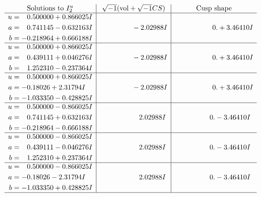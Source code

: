 \documentclass[1p]{elsarticle_modified}
\theoremstyle{definition}
\newcommand{\I}{\sqrt{-1}}
\begin{document}
$$\begin{array}{c|c|c}  
\text{Solutions to }I^u_{2}& \I (\text{vol} + \sqrt{-1}CS) & \text{Cusp shape}\\
 \hline 
\begin{aligned}
u &= \phantom{-}0.500000 + 0.866025 I \\
a &= \phantom{-}0.741145 - 0.632163 I \\
b &= -0.218964 + 0.666188 I\end{aligned}
 & \phantom{-0.000000 } -2.02988 I & \phantom{-0.000000 -}0. + 3.46410 I \\ \hline\begin{aligned}
u &= \phantom{-}0.500000 + 0.866025 I \\
a &= \phantom{-}0.439111 + 0.046276 I \\
b &= \phantom{-}1.252310 - 0.237364 I\end{aligned}
 & \phantom{-0.000000 } -2.02988 I & \phantom{-0.000000 -}0. + 3.46410 I \\ \hline\begin{aligned}
u &= \phantom{-}0.500000 + 0.866025 I \\
a &= -0.18026 + 2.31794 I \\
b &= -1.033350 - 0.428825 I\end{aligned}
 & \phantom{-0.000000 } -2.02988 I & \phantom{-0.000000 -}0. + 3.46410 I \\ \hline\begin{aligned}
u &= \phantom{-}0.500000 - 0.866025 I \\
a &= \phantom{-}0.741145 + 0.632163 I \\
b &= -0.218964 - 0.666188 I\end{aligned}
 & \phantom{-0.000000 -}2.02988 I & \phantom{-0.000000 } 0. - 3.46410 I \\ \hline\begin{aligned}
u &= \phantom{-}0.500000 - 0.866025 I \\
a &= \phantom{-}0.439111 - 0.046276 I \\
b &= \phantom{-}1.252310 + 0.237364 I\end{aligned}
 & \phantom{-0.000000 -}2.02988 I & \phantom{-0.000000 } 0. - 3.46410 I \\ \hline\begin{aligned}
u &= \phantom{-}0.500000 - 0.866025 I \\
a &= -0.18026 - 2.31794 I \\
b &= -1.033350 + 0.428825 I\end{aligned}
 & \phantom{-0.000000 -}2.02988 I & \phantom{-0.000000 } 0. - 3.46410 I\\
 \hline 
 \end{array}$$\newpage\newpage\renewcommand{\arraystretch}{1}
\end{document}
